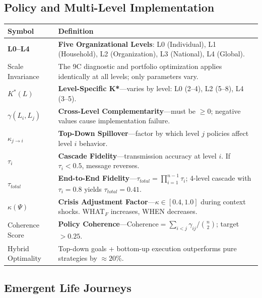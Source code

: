 \subsection{Policy and Multi-Level Implementation}

\begin{longtable}{@{}p{2.8cm}p{10cm}@{}}
\toprule
\textbf{Symbol} & \textbf{Definition} \\
\midrule
\endhead
\textbf{L0--L4} & \textbf{Five Organizational Levels}: L0 (Individual), L1 (Household), L2 (Organization), L3 (National), L4 (Global). \\[6pt]
Scale Invariance & The 9C diagnostic and portfolio optimization applies identically at all levels; only parameters vary. \\[6pt]
$K^*(L)$ & \textbf{Level-Specific K*}---varies by level: L0 (2--4), L2 (5--8), L4 (3--5). \\[6pt]
$\gamma(L_i, L_j)$ & \textbf{Cross-Level Complementarity}---must be $\geq 0$; negative values cause implementation failure. \\[6pt]
$\kappa_{j \to i}$ & \textbf{Top-Down Spillover}---factor by which level $j$ policies affect level $i$ behavior. \\[6pt]
$\tau_i$ & \textbf{Cascade Fidelity}---transmission accuracy at level $i$. If $\tau_i < 0.5$, message reverses. \\[6pt]
$\tau_{total}$ & \textbf{End-to-End Fidelity}---$\tau_{total} = \prod_{i=1}^{n-1} \tau_i$; 4-level cascade with $\tau_i = 0.8$ yields $\tau_{total} = 0.41$. \\[6pt]
$\kappa(\Psi)$ & \textbf{Crisis Adjustment Factor}---$\kappa \in [0.4, 1.0]$ during context shocks. WHAT$_F$ increases, WHEN decreases. \\[6pt]
Coherence Score & \textbf{Policy Coherence}---$\text{Coherence} = \sum_{i<j} \gamma_{ij} / \binom{n}{2}$; target $> 0.25$. \\[6pt]
Hybrid Optimality & Top-down goals + bottom-up execution outperforms pure strategies by $\approx 20\%$. \\
\bottomrule
\end{longtable}

\subsection{Emergent Life Journeys}

